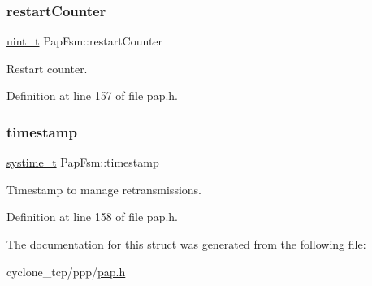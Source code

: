 \mbox{\label{structPapFsm_acfd494e70fec3eae6978eb5bc0c7cb57}} 
\subsubsection{\texorpdfstring{restart\+Counter}{restartCounter}}
{\footnotesize\ttfamily \hyperlink{compiler__port_8h_a12a1e9b3ce141648783a82445d02b58d}{uint\+\_\+t} Pap\+Fsm\+::restart\+Counter}



Restart counter. 



Definition at line 157 of file pap.\+h.

\mbox{\label{structPapFsm_ada695494f0dd007ced59fe10189ec4c2}} 
\subsubsection{\texorpdfstring{timestamp}{timestamp}}
{\footnotesize\ttfamily \hyperlink{compiler__port_8h_ae3e32a98d431a02106616da3071832dd}{systime\+\_\+t} Pap\+Fsm\+::timestamp}



Timestamp to manage retransmissions. 



Definition at line 158 of file pap.\+h.



The documentation for this struct was generated from the following file\+:\begin{DoxyCompactItemize}
\item 
cyclone\+\_\+tcp/ppp/\hyperlink{pap_8h}{pap.\+h}\end{DoxyCompactItemize}
